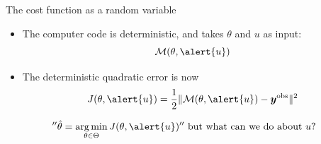 \documentclass[10pt,aspectratio=169]{beamer}
\newcommand{\Kspace}{\Theta}
\DeclareMathOperator*{\argmin}{arg\,min}
\newcommand{\yobs}{\bm{y}^{\mathrm{obs}}}
\newcommand{\kk}{\theta}
\newcommand{\uu}{u}
\begin{document}
\begin{frame}{The cost function as a random variable}
  \begin{itemize}
  \item The computer code is deterministic, and takes $\kk$ and $\uu$
    as input:
    \begin{equation*}
      \mathcal{M}(\kk,\alert{\uu})
    \end{equation*}
  \item The deterministic quadratic error is now
    \begin{equation*}
      J(\kk,\alert{\uu}) =  \frac12\|\mathcal{M}(\kk,\alert{\uu}) - \yobs\|^2
    \end{equation*}
  \end{itemize}

\begin{equation*}
  ''\hat{\kk} = \argmin_{\kk\in\Kspace} J(\kk,\alert{\uu})'' \text{ but what can we do about } \uu ?
\end{equation*}
\end{frame}
\end{document}
